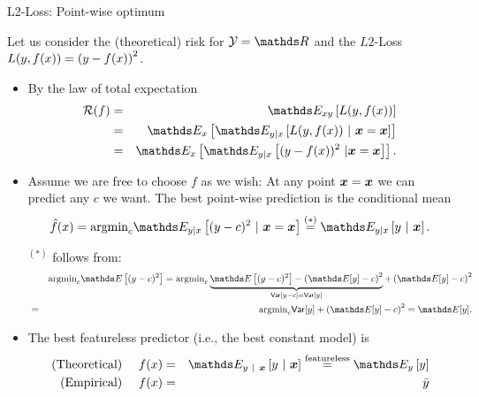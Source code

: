 \begin{vbframe}{L2-Loss: Point-wise optimum}

Let us consider the (theoretical) risk for  $\Yspace = \R$ and the $L2$-Loss $L(y, f(x)) = \left(y-f(x)\right)^2$. %

\begin{itemize}
\item By the law of total expectation
  \begin{eqnarray*}
    \riskf &=& \E_{xy} \left[\Lxy\right] 
    \\ &=& \E_x \left[\E_{y|x}\left[\Lxy~|~\xv = \xv\right]\right] \\
  &=& \E_x
  \left[\E_{y|x}\left[(y-\fx)^2~|\xv = \xv\right]\right]. 
  \end{eqnarray*}

\item Assume we are free to choose $f$ as we wish: At any point $\bm{x} = \bm{x}$ we can predict any $c$ we want. The best point-wise prediction is the conditional mean
$$
  \fxh = \mbox{argmin}_c \E_{y|x}\left[(y - c)^2 ~|~ \xv = \xv \right]\overset{(*)}{=} \E_{y|x} \left[y ~|~ \xv \right]. 
$$

\begin{footnotesize}
$^{(*)}$ follows from:
  \begin{eqnarray*}
  && \mbox{argmin}_c \E\left[(y - c)^2\right] = \mbox{argmin}_c \underbrace{\E\left[(y - c)^2\right] - \left(\E[y] - c\right)^2}_{\var[y - c] = \var[y]} + \left(\E[y] - c\right)^2 \\ &=& \mbox{argmin}_c \var[y] + \left(\E[y] - c\right)^2 = \E[y]. 
  \end{eqnarray*}
\end{footnotesize}


\item The best featureless predictor (i.e., the best constant model) is
\begin{eqnarray*}
  \text{(Theoretical) \quad}\fx &=& \E_{y~|~\xv}\left[y~|~\xv\right] \overset{\text{featureless}}{=} \E_y \left[y\right] \\
  \text{(Empirical) \quad}\fx &=& \bar y 
\end{eqnarray*} 

\end{itemize}

\end{vbframe}


